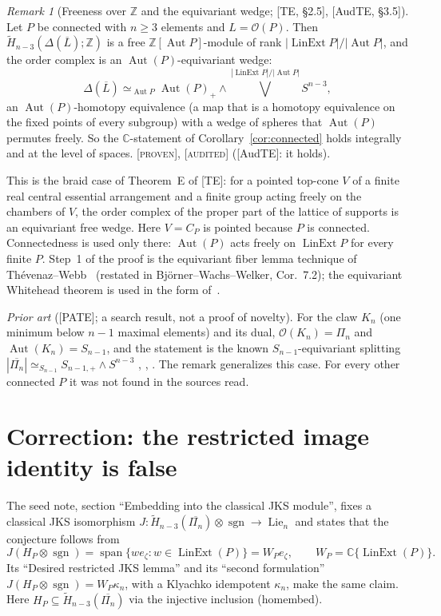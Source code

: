 \documentclass[11pt]{article}
\theoremstyle{definition}
\theoremstyle{remark}
\newtheorem{remark}[theorem]{Remark}
\newcommand{\OP}{\mathcal O}
\newcommand{\Lin}{\operatorname{LinExt}}
\newcommand{\Aut}{\operatorname{Aut}}
\newcommand{\Lie}{\operatorname{Lie}}
\newcommand{\sgn}{\operatorname{sgn}}
\newcommand{\st}[1]{\textup{[\textsc{#1}]}}
\begin{document}
\begin{remark}[Freeness over $\mathbb Z$ and the equivariant wedge; {[TE,
\S2.5]}, {[AudTE, \S3.5]}]\label{rem:Zfree}
Let $P$ be connected with $n\ge3$ elements and $L=\OP(P)$. Then
$\widetilde H_{n-3}(\Delta(\overline L);\mathbb Z)$ is a free
$\mathbb Z[\Aut P]$-module of rank $|\Lin P|/|\Aut P|$, and the order complex
is an $\Aut(P)$-equivariant wedge:
\[
\Delta(\overline L)\simeq_{\Aut P}\Aut(P)_+\wedge
\bigvee^{|\Lin P|/|\Aut P|}S^{n-3},
\]
an $\Aut(P)$-homotopy equivalence (a map that is a homotopy equivalence on
the fixed points of every subgroup) with a wedge of spheres that $\Aut(P)$ permutes freely. So the
$\mathbb C$-statement of Corollary~\ref{cor:connected} holds integrally and at
the level of spaces. \st{proven}, \st{audited} ([AudTE]: it holds).

This is the braid case of Theorem~E of [TE]: for a pointed top-cone $V$ of a
finite real central essential arrangement and a finite group acting freely on
the chambers of $V$, the order complex of the proper part of the lattice of
supports is an equivariant free wedge. Here $V=C_P$ is pointed because $P$
is connected. Connectedness is used only there: $\Aut(P)$ acts freely on
$\Lin P$ for every finite $P$. Step~1 of the proof is the equivariant fiber
lemma technique of Th\'evenaz--Webb~\cite{ThevenazWebb} (restated in
Bj\"orner--Wachs--Welker, Cor.~7.2); the equivariant Whitehead theorem is
used in the form of~\cite[Cor.~I.3.3]{May96}.

\emph{Prior art} ([PATE]; a search result, not a proof of novelty). For the
claw $K_n$ (one minimum below $n-1$ maximal elements) and its dual,
$\OP(K_n)=\Pi_n$ and $\Aut(K_n)=S_{n-1}$, and the statement is the known
$S_{n-1}$-equivariant splitting
$|\overline{\Pi_n}|\simeq_{S_{n-1}}S_{n-1,+}\wedge S^{n-3}$
\cite[Ex.~1.4]{Arone15}, \cite[Example after Thm~5.10]{AroneBrantner},
\cite{Donau}. The remark generalizes this case. For every other connected $P$
it was not found in the sources read.
\end{remark}

\section{Correction: the restricted image identity is false}
\label{sec:correction}

The seed note, section ``Embedding into the classical JKS module'', fixes a
classical JKS isomorphism
$J:\widetilde H_{n-3}(\overline{\Pi_n})\otimes\sgn\to\Lie_n$ and states that
the conjecture follows from
\begin{equation}\label{eq:RL}
J(H_P\otimes\sgn)=\operatorname{span}\{we_\zeta:w\in\Lin(P)\}=W_Pe_\zeta,
\qquad W_P=\mathbb C\{\Lin(P)\}.\tag{restrictionlemma}
\end{equation}
Its ``Desired restricted JKS lemma'' and its ``second formulation''
$J(H_P\otimes\sgn)=W_P\kappa_n$, with a Klyachko idempotent $\kappa_n$, make
the same claim. Here $H_P\subseteq\widetilde H_{n-3}(\overline{\Pi_n})$ via
the injective inclusion (homembed).
\end{document}

